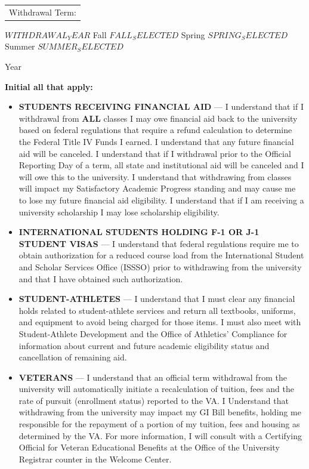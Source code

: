 \documentclass[11pt]{article}
\newcommand{\withdrawalYear}{$WITHDRAWAL_YEAR$}
\newcommand{\seasonFall}{$FALL_SELECTED$}
\newcommand{\seasonSpring}{$SPRING_SELECTED$}
\newcommand{\seasonSummer}{$SUMMER_SELECTED$}
\begin{document}
\noindent\begin{tabular}{@{}p{1.8in}@{}}
Withdrawal Term: \\
\end{tabular}
\underline{\withdrawalYear} \hspace{0.2in} Fall \seasonFall \hspace{0.2in} Spring \seasonSpring \hspace{0.2in} Summer \seasonSummer
\begin{flushright}
\scriptsize{Year}
\end{flushright}

\vspace{0.2cm}
\textbf{Initial all that apply:}

\begin{itemize}
\setlength\itemsep{0.5em}
\item[] \textbf{STUDENTS RECEIVING FINANCIAL AID} — I understand that if I withdrawal from \textbf{ALL} classes I may owe financial aid back to the university based on federal regulations that require a refund calculation to determine the Federal Title IV Funds I earned. I understand that any future financial aid will be canceled. I understand that if I withdrawal prior to the Official Reporting Day of a term, all state and institutional aid will be canceled and I will owe this to the university. I understand that withdrawing from classes will impact my Satisfactory Academic Progress standing and may cause me to lose my future financial aid eligibility. I understand that if I am receiving a university scholarship I may lose scholarship eligibility.

\item[] \textbf{INTERNATIONAL STUDENTS HOLDING F-1 OR J-1 STUDENT VISAS} — I understand that federal regulations require me to obtain authorization for a reduced course load from the International Student and Scholar Services Office (ISSSO) prior to withdrawing from the university and that I have obtained such authorization.

\item[] \textbf{STUDENT-ATHLETES} — I understand that I must clear any financial holds related to student-athlete services and return all textbooks, uniforms, and equipment to avoid being charged for those items. I must also meet with Student-Athlete Development and the Office of Athletics' Compliance for information about current and future academic eligibility status and cancellation of remaining aid.

\item[] \textbf{VETERANS} — I understand that an official term withdrawal from the university will automatically initiate a recalculation of tuition, fees and the rate of pursuit (enrollment status) reported to the VA. I Understand that withdrawing from the university may impact my GI Bill benefits, holding me responsible for the repayment of a portion of my tuition, fees and housing as determined by the VA. For more information, I will consult with a Certifying Official for Veteran Educational Benefits at the Office of the University Registrar counter in the Welcome Center.


\end{itemize}
\end{document}
